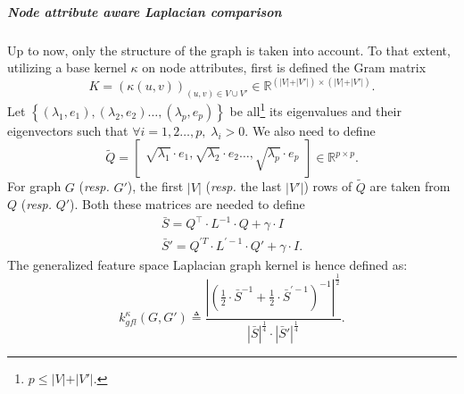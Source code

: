                 \subparagraph{Node attribute aware Laplacian comparison}
                    Up to now, only the structure of the graph is taken into account.
                    To that extent, utilizing a base kernel $\kappa$ on node attributes, first is defined the Gram matrix
                    \begin{equation*}
                        K=\left(\kappa\left(u, v\right)\right)_{(u,v) \in V \cup V'} \in \mathbb{R}^{\left(\vert V \vert + \vert V' \vert\right) \times \left(\vert V \vert + \vert V' \vert\right)}.
                    \end{equation*}
                    Let $\left\{ (\lambda_1, e_1), (\lambda_2, e_2)\dots,(\lambda_p, e_p) \right\}$ be all\footnote{$p \leq \vert V \vert + \vert V' \vert$.} its eigenvalues and their eigenvectors such that $\forall i = 1, 2 \dots, p,\; \lambda_i > 0$.
                    We also need to define
                    \begin{equation*}
                        \widetilde{Q} = \begin{bmatrix}
                            \sqrt{\lambda_1}\cdot e_1, \sqrt{\lambda_2}\cdot e_2 \dots, \sqrt{\lambda_p}\cdot e_p
                        \end{bmatrix} \in \mathbb{R}^{p \times p}.
                    \end{equation*}
                    For graph \(G\) (\textit{resp.} \(G'\)), the first $\vert V \vert$ (\textit{resp.} the last $\vert V' \vert$) rows of $\widetilde{Q}$ are taken from $Q$ (\textit{resp.} $Q'$).
                    Both these matrices are needed to define 
                    \begin{align*}
                        \bar{S} = Q^\intercal\cdot L ^{-1}\cdot Q + \gamma \cdot I\\
                        \bar{S}' = Q^{\prime T}\cdot L^{\prime -1}\cdot Q' + \gamma \cdot I.
                    \end{align*}
                    The generalized feature space Laplacian graph kernel is hence defined as:
                    \begin{equation}
                        \label{eq::generalized_feature_laplacian_kernel}
                        k^{\kappa}_{gfl}(G, G') \triangleq \frac{\left\lvert \left(\frac{1}{2} \cdot \bar{S}^{-1} + \frac{1}{2} \cdot \bar{S}^{\prime -1} \right)^{-1} \right\rvert^{\frac{1}{2}}}{\left\lvert \bar{S}\right\rvert^{\frac{1}{4}}\cdot\left\lvert \bar{S}' \right\rvert^{\frac{1}{4}}}.
                    \end{equation}

